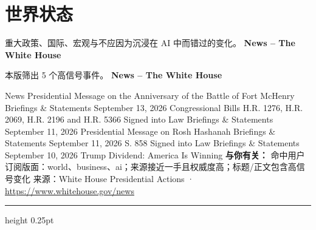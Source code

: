 \documentclass[10.5pt]{ctexart}
\begin{document}
\section*{世界状态}
{\color{ormuted} 重大政策、国际、宏观与不应因为沉浸在 AI 中而错过的变化。}
\vspace{2mm}
{\LARGE\bfseries News – The White House}\par
\vspace{1mm}
{\color{ormuted} 本版筛出 5 个高信号事件。}
\vspace{3mm}
{\Large\bfseries News – The White House}\par
News Presidential Message on the Anniversary of the Battle of Fort McHenry Briefings \& Statements September 13, 2026 Congressional Bills H.R. 1276, H.R. 2069, H.R. 2196 and H.R. 5366 Signed into Law Briefings \& Statements September 11, 2026 Presidential Message on Rosh Hashanah Briefings \& Statements September 11, 2026 S. 858 Signed into Law Briefings \& Statements September 10, 2026 Trump Dividend: America Is Winning
\textbf{与你有关：} 命中用户订阅版面：world、business、ai；来源接近一手且权威度高；标题/正文包含高信号变化
{\footnotesize\color{ormuted} 来源：White House Presidential Actions · \url{https://www.whitehouse.gov/news}}
\vspace{4mm}
\hrule height 0.25pt
\vspace{3mm}
\end{document}

